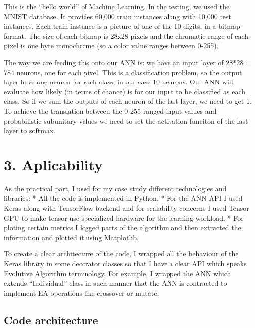 \documentclass[11pt]{article}
\begin{document}
This is the ``hello world'' of Machine Learning. In the testing, we used
the \href{http://yann.lecun.com/exdb/mnist/}{MNIST} database. It
provides 60,000 train instances along with 10,000 test instances. Each
train instance is a picture of one of the 10 digits, in a bitmap format.
The size of each bitmap is 28x28 pixels and the chromatic range of each
pixel is one byte monochrome (so a color value ranges between 0-255).

The way we are feeding this onto our ANN is: we have an input layer of
28*28 = 784 neurons, one for each pixel. This is a classification
problem, so the output layer have one neuron for each class, in our case
10 neurons. Our ANN will evaluate how likely (in terms of chance) is for
our input to be classified as each class. So if we sum the outputs of
each neuron of the last layer, we need to get 1. To achieve the
translation between the 0-255 ranged input values and probabilistic
subunitary values we need to set the activation funciton of the last
layer to softmax.

    \hypertarget{aplicability}{%
\section{3. Aplicability}\label{aplicability}}

As the practical part, I used for my case study different technologies
and libraries: * All the code is implemented in Python. * For the ANN
API I used Keras along with TensorFlow backend and for scalability
concerns I used Tensor GPU to make tensor use specialized hardware for
the learning workload. * For ploting certain metrics I logged parts of
the algorithm and then extracted the information and plotted it using
Matplotlib.

To create a clear architecture of the code, I wrapped all the behaviour
of the Keras library in some decorator classes so that I have a clear
API which speaks Evolutive Algorithm terminology. For example, I wrapped
the ANN which extends ``Individual'' class in such manner that the ANN
is contracted to implement EA operations like crossover or mutate.

\hypertarget{code-architecture}{%
\subsection{Code architecture}\label{code-architecture}}
\end{document}
